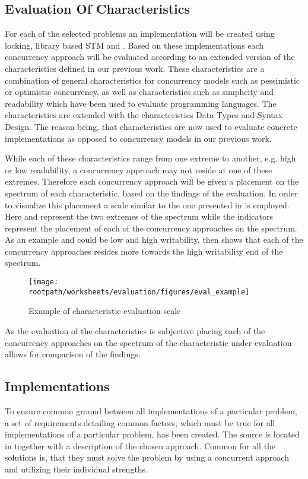 \subsection{Evaluation Of Characteristics}
For each of the selected problems an implementation will be created using locking, library based \ac{STM} and \stmname. Based on these implementations each concurrency approach will be evaluated according to an extended version of the characteristics defined in our previous work\cite[p. 15-21]{dpt907e14trending}. These characteristics are a combination of general characteristics for concurrency models such as pessimistic or optimistic concurrency, as well as characteristics such as simplicity and readability which have been used to evaluate programming languages\cite[p. 7]{sebestaProLang}. The characteristics are extended with the characteristics Data Types and Syntax Design. The reason being, that characteristics are now used to evaluate concrete implementations as opposed to concurrency models in our previous work\cite{dpt907e14trending}.

While each of these characteristics range from one extreme to another, e.g. high or low readability, a concurrency approach may not reside at one of these extremes. Therefore each concurrency approach will be given a placement on the spectrum of each characteristic, based on the findings of the evaluation. In order to visualize this placement a scale similar to the one presented in  is employed. Here  and  represent the two extremes of the spectrum while the indicators represent the placement of each of the concurrency approaches on the spectrum. As an example  and  could be low and high writability,  then shows that each of the concurrency approaches resides more towards the high writability end of the spectrum.
\begin{figure}[ht!]
\centering
\texttt{[image: \\rootpath/worksheets/evaluation/figures/eval\_example]}
\caption{Example of characteristic evaluation scale}\label{fig:evel_example}
\end{figure}
As the evaluation of the characteristics is subjective placing each of the concurrency approaches on the spectrum of the characteristic under evaluation allows for comparison of the findings.

\subsection{Implementations}
To ensure common ground between all implementations of a particular problem, a set of requirements detailing common factors, which must be true for all implementations of a particular problem, has been created. The source is located in \bsref{} together with a description of the chosen approach. Common for all the solutions is, that they must solve the problem by using a concurrent approach and utilizing their individual strengths.

